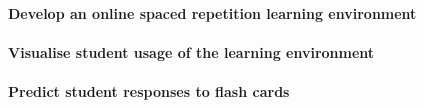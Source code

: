\paragraph{Develop an online spaced repetition learning environment}
\paragraph{Visualise student usage of the learning environment}
\paragraph{Predict student responses to flash cards}
